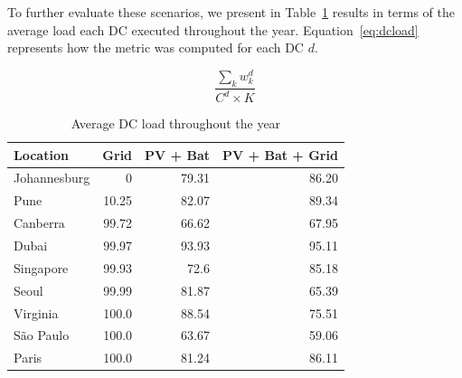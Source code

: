 

To further evaluate these scenarios, we present in Table~\ref{tab:dcutilization} results in terms of the average load each DC executed throughout the year. Equation~\eqref{eq:dcload} represents how the metric was computed for each DC $d$.

\begin{equation}\label{eq:dcload}
\frac{\sum_k w^d_k} {C^d \times K }
\end{equation}


\begin{table}[!ht]
  
  \caption{Average DC load throughout the year }\label{tab:dcutilization} \centering

  \begin{tabular}{|l|r|r|r|}
   \hline
    
  \textbf{Location} &   \textbf{Grid} & \textbf{PV + Bat} & \textbf{PV + Bat + Grid}  \\
  \hline
  Johannesburg & 0 & 79.31  & 86.20  \\
  \hline
  Pune  & 10.25 &  82.07 & 89.34   \\
  \hline
  Canberra  & 99.72 & 66.62 & 67.95 \\
  \hline
  Dubai   & 99.97 & 93.93 & 95.11   \\
  \hline
  Singapore & 99.93 & 72.6  & 85.18 \\
  \hline     
  Seoul    & 99.99 & 81.87 & 65.39      \\
  \hline
  Virginia   & 100.0 & 88.54 & 75.51 \\
  \hline
  São Paulo   & 100.0 & 63.67 & 59.06 \\
  \hline 
  Paris    & 100.0 & 81.24  &  86.11    \\
  \hline  

\end{tabular}  
\end{table}



